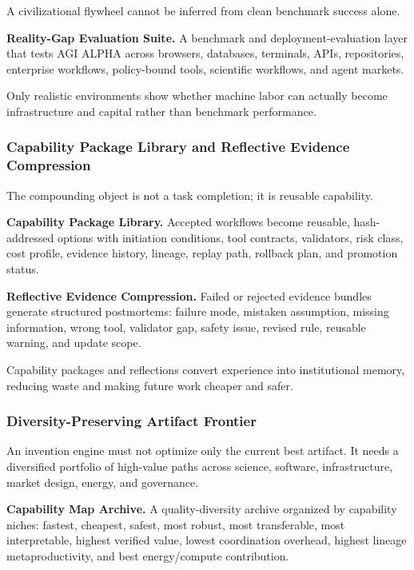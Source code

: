\documentclass[
  11pt,
]{article}
\begin{document}
A civilizational flywheel cannot be inferred from clean benchmark
success alone.

\textbf{Reality-Gap Evaluation Suite.} A benchmark and
deployment-evaluation layer that tests AGI ALPHA across browsers,
databases, terminals, APIs, repositories, enterprise workflows,
policy-bound tools, scientific workflows, and agent markets.

Only realistic environments show whether machine labor can actually
become infrastructure and capital rather than benchmark performance.

\subsubsection{Capability Package Library and Reflective Evidence
Compression}\label{capability-package-library-and-reflective-evidence-compression}

The compounding object is not a task completion; it is reusable
capability.

\textbf{Capability Package Library.} Accepted workflows become reusable,
hash-addressed options with initiation conditions, tool contracts,
validators, risk class, cost profile, evidence history, lineage, replay
path, rollback plan, and promotion status.

\textbf{Reflective Evidence Compression.} Failed or rejected evidence
bundles generate structured postmortems: failure mode, mistaken
assumption, missing information, wrong tool, validator gap, safety
issue, revised rule, reusable warning, and update scope.

Capability packages and reflections convert experience into
institutional memory, reducing waste and making future work cheaper and
safer.

\subsubsection{Diversity-Preserving Artifact
Frontier}\label{diversity-preserving-artifact-frontier}

An invention engine must not optimize only the current best artifact. It
needs a diversified portfolio of high-value paths across science,
software, infrastructure, market design, energy, and governance.

\textbf{Capability Map Archive.} A quality-diversity archive organized
by capability niches: fastest, cheapest, safest, most robust, most
transferable, most interpretable, highest verified value, lowest
coordination overhead, highest lineage metaproductivity, and best
energy/compute contribution.
\end{document}
